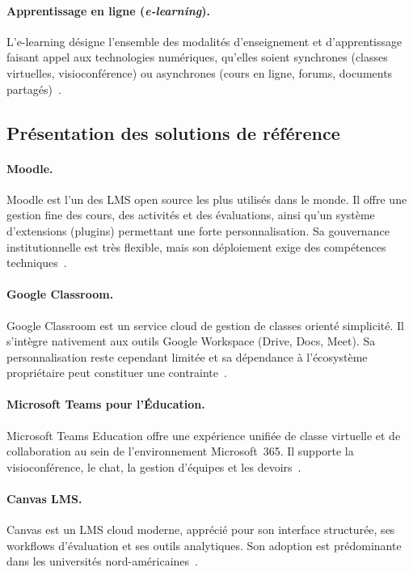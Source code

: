 \paragraph{Apprentissage en ligne (\textit{e-learning}).}
L'e-learning d\'esigne l'ensemble des modalit\'es d'enseignement et d'apprentissage faisant appel aux technologies num\'eriques, qu'elles soient synchrones (classes virtuelles, visioconf\'erence) ou asynchrones (cours en ligne, forums, documents partag\'es)~\cite{unesco_digital_2026}.

\subsection{Pr\'esentation des solutions de r\'ef\'erence}

\paragraph{Moodle.}
Moodle est l'un des LMS open source les plus utilis\'es dans le monde. Il offre une gestion fine des cours, des activit\'es et des \'evaluations, ainsi qu'un syst\`eme d'extensions (plugins) permettant une forte personnalisation. Sa gouvernance institutionnelle est tr\`es flexible, mais son d\'eploiement exige des comp\'etences techniques~\cite{moodle_overview_2026}.

\paragraph{Google Classroom.}
Google Classroom est un service cloud de gestion de classes orient\'e simplicit\'e. Il s'int\`egre nativement aux outils Google Workspace (Drive, Docs, Meet). Sa personnalisation reste cependant limit\'ee et sa d\'ependance \`a l'\'ecosyst\`eme propri\'etaire peut constituer une contrainte~\cite{google_classroom_2026}.

\paragraph{Microsoft Teams pour l'\'Education.}
Microsoft Teams Education offre une exp\'erience unifi\'ee de classe virtuelle et de collaboration au sein de l'environnement Microsoft~365. Il supporte la visioconf\'erence, le chat, la gestion d'\'equipes et les devoirs~\cite{microsoft_teams_edu_2026}.

\paragraph{Canvas LMS.}
Canvas est un LMS cloud moderne, appr\'eci\'e pour son interface structur\'ee, ses workflows d'\'evaluation et ses outils analytiques. Son adoption est pr\'edominante dans les universit\'es nord-am\'ericaines~\cite{canvas_overview_2026}.

